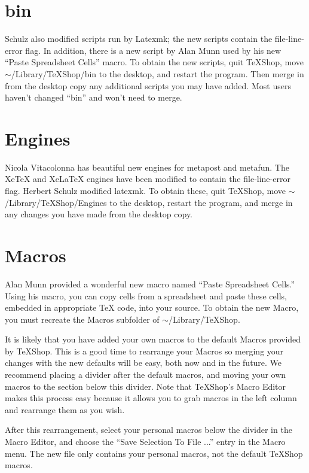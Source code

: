 \documentclass[11pt, oneside]{amsart}
\begin{document}
\section{bin}

Schulz also modified scripts run by Latexmk; the new scripts contain the file-line-error flag. In addition, there is a new script by Alan Munn used by his new  ``Paste Spreadsheet Cells'' macro. To obtain the new scripts, quit TeXShop, move $\sim$/Library/TeXShop/bin to the desktop, and restart the program. Then merge in from the desktop copy any additional scripts you may have added. Most users haven't changed ``bin'' and won't need to merge.

\section{Engines}

Nicola Vitacolonna has beautiful new engines for metapost and metafun. The XeTeX and XeLaTeX engines have been modified to contain the file-line-error flag. Herbert Schulz modified latexmk. To obtain these, quit TeXShop, move $\sim$/Library/TeXShop/Engines to the desktop, restart the program, and merge in any changes you have made from the desktop copy.

\section{Macros}

Alan Munn provided a wonderful new macro named ``Paste Spreadsheet Cells.'' Using his macro, you can copy cells from a spreadsheet and paste these cells, embedded in appropriate TeX code, into your source. To obtain the new Macro, you must recreate the Macros subfolder of $\sim$/Library/TeXShop.

It is likely that you have added your own macros to the default Macros provided by TeXShop. This is a good time to rearrange your Macros so merging your changes with the new defaults will be easy, both now and in the future. We recommend placing a divider after the default macros, and moving your own macros to the section below this divider. Note that TeXShop's Macro Editor makes this process easy because it allows you to grab macros in the left column and rearrange them as you wish.

After this rearrangement, select your personal macros below the divider in the Macro Editor, and choose the  ``Save Selection To File ...'' entry in the Macro menu. The new file only contains your personal macros, not the default TeXShop macros.
\end{document}
